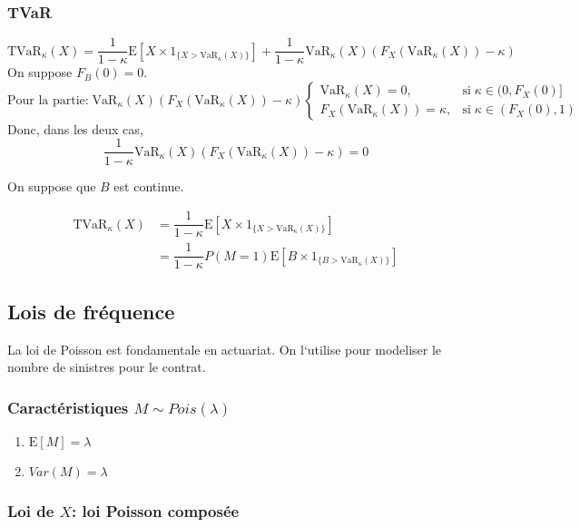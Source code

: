 \subsubsection*{TVaR}\label{tvar}

\[
\text{TVaR}_\kappa (X)=\dfrac{1}{1-\kappa}\text{E}\left [X\times 1_{\{X>\text{VaR}_\kappa (X) \}}\right ]+\dfrac{1}{1-\kappa}\text{VaR}_\kappa (X) \left (F_X(\text{VaR}_\kappa (X) )-\kappa\right )
\] On suppose \(F_B(0)=0\). \[
\text{Pour la partie:}\; \text{VaR}_\kappa (X) \left (F_X(\text{VaR}_\kappa (X) )-\kappa\right )\begin{cases}
\text{VaR}_\kappa (X) =0,& \text{si}\;\kappa \in(0,F_X(0)]\\
F_X(\text{VaR}_\kappa (X) )=\kappa,& \text{si}\;\kappa\in(F_X(0),1)
\end{cases}
\] Donc, dans les deux cas, \[
\dfrac{1}{1-\kappa}\text{VaR}_\kappa (X) \left (F_X(\text{VaR}_\kappa (X) )-\kappa\right )=0
\]

On suppose que \(B\) est continue.

\begin{align*}
\text{TVaR}_\kappa (X)& =\dfrac{1}{1-\kappa}\text{E}\left [X\times 1_{\{X>\text{VaR}_\kappa (X) \}}\right ]\\
& = \dfrac{1}{1-\kappa} P(M=1)\text{E}\left [B\times 1_{\{B>\text{VaR}_\kappa (X) \}}\right ]
\end{align*}

\subsection{Lois de fréquence}\label{lois-de-frequence}

La loi de Poisson est fondamentale en actuariat. On l`utilise pour
modeliser le nombre de sinistres pour le contrat.

\subsubsection*{Caractéristiques \(M \sim Pois(\lambda)\)}\label{caracteristiques-m-sim-poislambda}


\begin{enumerate}
\item $\text{E}[M]=\lambda$
\item $Var(M)=\lambda$
\end{enumerate}

\subsubsection*{Loi de \(X\): loi Poisson composée}\label{loi-de-x-loi-poisson-composee}

